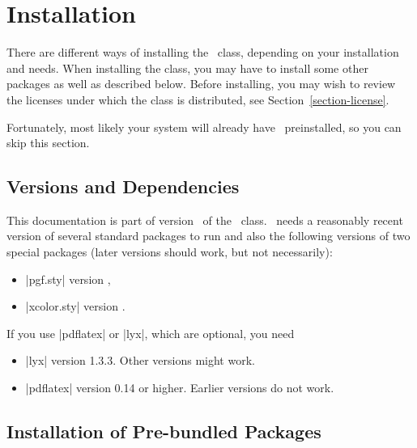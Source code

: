 %
%
%


\section{Installation}

\label{section-installation}

There are different ways of installing the \beamer\ class, depending on your installation and needs. When installing the class, you may have to install some other packages as well as described below. Before installing, you may wish to review the licenses under which the class is distributed, see Section~\ref{section-license}.

Fortunately, most likely your system will already have \beamer\ preinstalled, so you can skip this section.


\subsection{Versions and Dependencies}

This documentation is part of version \beamerugversion\ of the \beamer\ class. \beamer\ needs a reasonably recent version of several standard packages to run and also the following versions of two special packages (later versions should work, but not necessarily):
\begin{itemize}
\item
  |pgf.sty| version \beamerugpgfversion,
\item
  |xcolor.sty| version \beamerugxcolorversion.
\end{itemize}

If you use |pdflatex| or |lyx|, which are optional, you need
\begin{itemize}
\item
  |lyx| version 1.3.3. Other versions might work.
\item
  |pdflatex| version 0.14 or higher. Earlier versions do not work.
\end{itemize}


\subsection{Installation of Pre-bundled Packages}

